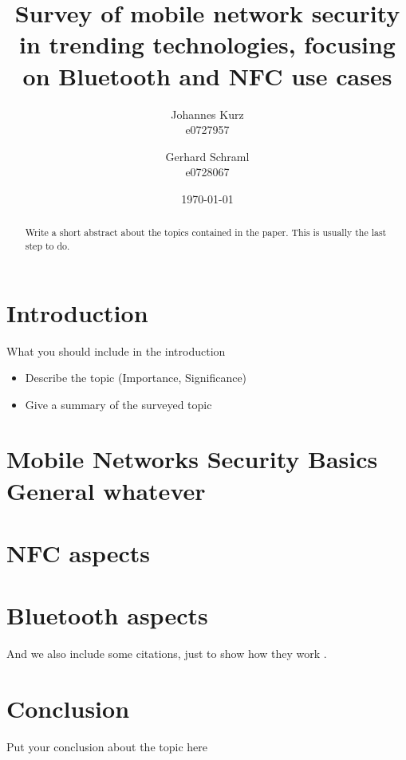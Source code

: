 \documentclass[12pt,a4paper]{article}
\title{ Survey of mobile network security in trending technologies, focusing on Bluetooth and NFC use cases }
\author{ Johannes Kurz \\
         e0727957 \\%
         \and
         Gerhard Schraml \\
         e0728067 %
}
\date{\today}
\begin{document}
\maketitle

\begin{abstract}
\noindent
Write a short abstract about the topics contained in the paper. This is usually the last step to do.
\end{abstract}


\section{Introduction}
What you should include in the introduction
\begin{itemize}
 \item Describe the topic (Importance, Significance)
 \item Give a summary of the surveyed topic
\end{itemize}


\section{Mobile Networks Security Basics General whatever}

\section{NFC aspects}

\section{Bluetooth aspects}

And we also include some citations, just to show how they work \cite{Lamport:LaTeX,greenwade93}.

\section{Conclusion}
Put your conclusion about the topic here



{}

\end{document}
